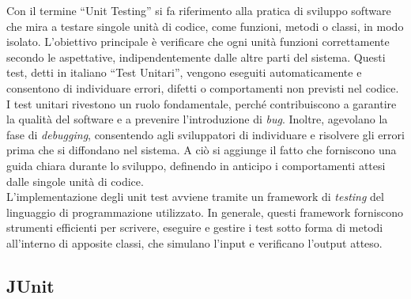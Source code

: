 Con il termine “Unit Testing” si fa riferimento alla pratica di sviluppo software che mira a testare singole unità di codice, come funzioni, metodi o classi, in modo isolato. L’obiettivo principale è verificare che ogni unità funzioni correttamente secondo le aspettative, indipendentemente dalle altre parti del sistema.\cite{UNITTEST_geeksforgeeks} Questi test, detti in italiano “Test Unitari”, vengono eseguiti automaticamente e consentono di individuare errori, difetti o comportamenti non previsti nel codice.\\
I test unitari rivestono un ruolo fondamentale, perché contribuiscono a garantire la qualità del software e a prevenire l’introduzione di \textit{bug}. Inoltre, agevolano la fase di \textit{debugging}, consentendo agli sviluppatori di individuare e risolvere gli errori prima che si diffondano nel sistema. A ciò si aggiunge il fatto che forniscono una guida chiara durante lo sviluppo, definendo in anticipo i comportamenti attesi dalle singole unità di codice.\cite{UNITTEST_wikipedia}\\
L’implementazione degli unit test avviene tramite un framework di \textit{testing} del linguaggio di programmazione utilizzato. In generale, questi framework forniscono strumenti efficienti per scrivere, eseguire e gestire i test sotto forma di metodi all’interno di apposite classi, che simulano l’input e verificano l’output atteso.

\subsection{JUnit}

